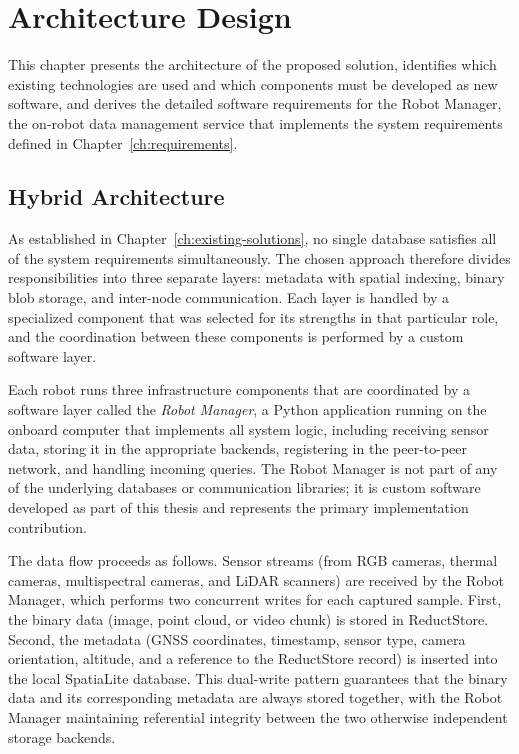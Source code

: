 
\chapter{Architecture Design} \label{ch:architecture}

This chapter presents the architecture of the proposed solution, identifies which existing technologies are used and which components must be developed as new software, and derives the detailed software requirements for the Robot Manager, the on-robot data management service that implements the system requirements defined in Chapter~\ref{ch:requirements}.


\section{Hybrid Architecture} \label{sec:high-level-architecture}

As established in Chapter~\ref{ch:existing-solutions}, no single database satisfies all of the system requirements simultaneously. The chosen approach therefore divides responsibilities into three separate layers: metadata with spatial indexing, binary blob storage, and inter-node communication. Each layer is handled by a specialized component that was selected for its strengths in that particular role, and the coordination between these components is performed by a custom software layer.

Each robot runs three infrastructure components that are coordinated by a software layer called the \emph{Robot Manager}, a Python application running on the onboard computer that implements all system logic, including receiving sensor data, storing it in the appropriate backends, registering in the peer-to-peer network, and handling incoming queries. The Robot Manager is not part of any of the underlying databases or communication libraries; it is custom software developed as part of this thesis and represents the primary implementation contribution.

The data flow proceeds as follows. Sensor streams (from RGB cameras, thermal cameras, multispectral cameras, and LiDAR scanners) are received by the Robot Manager, which performs two concurrent writes for each captured sample. First, the binary data (image, point cloud, or video chunk) is stored in ReductStore. Second, the metadata (GNSS coordinates, timestamp, sensor type, camera orientation, altitude, and a reference to the ReductStore record) is inserted into the local SpatiaLite database. This dual-write pattern guarantees that the binary data and its corresponding metadata are always stored together, with the Robot Manager maintaining referential integrity between the two otherwise independent storage backends.

